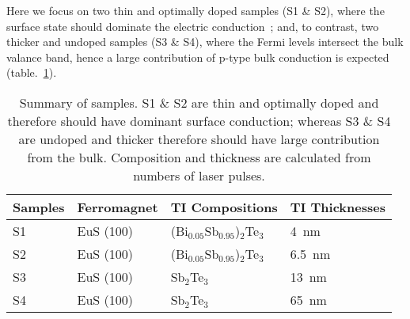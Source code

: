 Here we focus on two thin and optimally doped samples (S1 \& S2), where the surface state should dominate the electric conduction~\cite{ZhangJS2011}; and, to contrast, two thicker and undoped samples (S3 \& S4), where the Fermi levels intersect the bulk valance band, hence a large contribution of p-type bulk conduction is expected (table.~\ref{tab:bl2018_samples}).%
\begin{table}[ht]
    \centering
    \begin{tabularx}{0.7\columnwidth}[t]{l|l|l|X}
    \caption[Summary of (Bi$_x$Sb$_{1-x}$)$_2$Te$_3$--EuS bilayer samples]{\label{tab:bl2018_samples}Summary of samples. S1 \& S2 are thin and optimally doped and therefore should have dominant surface conduction; whereas S3 \& S4 are undoped and thicker therefore should have large contribution from the bulk. Composition and thickness are calculated from numbers of laser pulses.}\\
		\hline\hline
        Samples & Ferromagnet & TI Compositions & TI Thicknesses\\
        \hline%
        S1 & EuS (100) & (Bi$_{0.05}$Sb$_{0.95}$)$_2$Te$_3$ & 4~nm\\
        S2 & EuS (100) & (Bi$_{0.05}$Sb$_{0.95}$)$_2$Te$_3$ & 6.5~nm\\
        S3 & EuS (100) & Sb$_2$Te$_3$ & 13~nm\\
        S4 & EuS (100) & Sb$_2$Te$_3$ & 65~nm\\
		\hline\hline
    \end{tabularx}
\end{table}%


